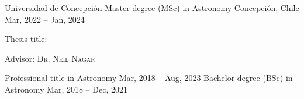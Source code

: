 
\begin{cventries}

  \cventry
    {Universidad de Concepción}
    {\href{https://joacoh.github.io/files/Magister_Astronomia.PDF}{Master degree} (MSc) in Astronomy}
    {Concepción, Chile}
    {Mar, 2022 -- Jan, 2024}
    {
      \begin{cvitems}
        \item{Thesis title: }
        \item{Advisor: \textsc{Dr. Neil Nagar}}
      \end{cvitems}
      \vspace{1em}
    }
  \cventryprevrole
    {\href{https://joacoh.github.io/files/Titulo_Astronomia.PDF}{Professional title} in Astronomy}
    {Mar, 2018 -- Aug, 2023}
    {}
  \cventryprevrole
    {\href{https://joacoh.github.io/files/Licenciatura_Astronomia.pdf}{Bachelor degree} (BSc) in Astronomy}
    {Mar, 2018 -- Dec, 2021}
    {}

    

\end{cventries}
